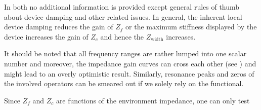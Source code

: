 In both \cite{colgate4,goranthesis} no additional information is provided except general rules of thumb about device damping and other
related issues. In general, the inherent local device damping reduces the gain of $Z_f$ or the maximum stiffness displayed by the 
device increases the gain of $Z_c$ and hence the $Z_{\text{width}}$ increases.

It should be noted that all frequency ranges are rather lumped into one scalar number and moreover, the impedance gain curves can
cross each other (see \cite{goranthesis}) and might lead to an overly optimistic result. Similarly, resonance peaks and zeros of the
involved operators can be smeared out if we solely rely on the functional. 

Since $Z_f$ and $Z_c$ are functions of the environment impedance, one can only test 



